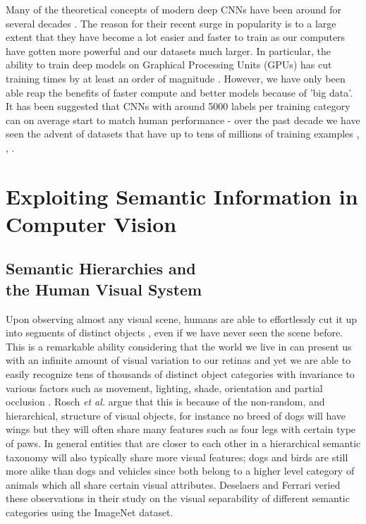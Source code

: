 \documentclass[12pt]{report}
\begin{document}
Many of the theoretical concepts of modern deep CNNs have been around for several decades \cite{JurgenSchmidhuber2015}. The reason for their recent surge in popularity is to a large extent that they have become a lot easier and faster to train as our computers have gotten more powerful and our datasets much larger. In particular, the ability to train deep models on Graphical Processing Units (GPUs) has cut training times by at least an order of magnitude \cite{Lecun2015}. However, we have only been able reap the benefits of faster compute and better models because of 'big data'. It has been suggested that CNNs with around 5000 labels per training category can on average start to match human performance \cite{Goodfellow2016} - over the past decade we have seen the advent of datasets that have up to tens of millions of training examples \cite{Russakovsky2015i}, \cite{JiaDeng2009}, \cite{Netzer2011}.

\section{Exploiting Semantic Information in \\ Computer Vision}

\subsection{Semantic Hierarchies and \\ the Human Visual System}
Upon observing almost any visual scene, humans are able to effortlessly cut it up into segments of distinct objects \cite{Rosch1976}, even if we have never seen the scene before. This is a remarkable ability considering that the world we live in can present us with an infinite amount of visual variation to our retinas and yet we are able to easily recognize tens of thousands of distinct object categories \cite{Biederman1989} with invariance to various factors such as movement, lighting, shade, orientation and partial occlusion \cite{DiCarlo2012}. Rosch \textit{et al.} \cite{Rosch1976} argue that this is because of the non-random, and hierarchical, structure of visual objects, for instance no breed of dogs will have wings but they will often share many features such as four legs with certain type of paws. In general entities that are closer to each other in a hierarchical semantic taxonomy will also typically share more visual features; dogs and birds are still more alike than dogs and vehicles since both belong to a higher level category of animals which all share certain visual attributes. Deselaers and Ferrari \cite{Deselaers2011} veried these observations in their study on the visual separability of different semantic categories using the ImageNet dataset.
\end{document}
